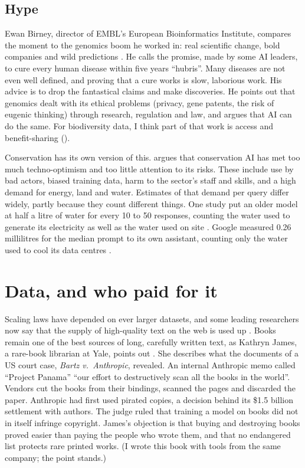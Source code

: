 \subsection{Hype}

Ewan Birney, director of EMBL's European Bioinformatics Institute, compares the
moment to the genomics boom he worked in: real scientific change, bold companies
and wild predictions \parencite{birney2026genomics}. He calls the promise,
made by some AI leaders, to cure every human disease within five years
``hubris''. Many
diseases are not even well defined, and proving that a cure works is slow,
laborious work. His advice is to drop the fantastical claims and make
discoveries. He points out that genomics dealt with its ethical problems
(privacy, gene patents, the risk of eugenic thinking) through research,
regulation and law, and argues that AI can do the same. For biodiversity data,
I think part of that work is access and benefit-sharing ().

Conservation has its own version of this. \textcite{sandbrook2024hype} argues
that conservation AI has met too much techno-optimism and too little attention
to its risks. These include use by bad actors, biased training data, harm to the
sector's staff and skills, and a high demand for energy, land and water. Estimates
of that demand per query differ widely, partly because they count different
things. One study put an older model at half a litre of water for every 10 to
50 responses, counting the water used to generate its electricity as well as
the water used on site \parencite{li2023thirsty}. Google measured 0.26
millilitres for the median prompt to its own assistant, counting only the water
used to cool its data centres \parencite{elsworth2025google}.

\section{Data, and who paid for it}

Scaling laws have depended on ever larger datasets, and some leading
researchers now say that the supply of high-quality text on the web is used up
\parencite{aiindex2026}. Books remain one of the best sources of long,
carefully written text, as Kathryn James, a rare-book librarian at Yale, points
out \parencite{james2026anthropicbooks}. She describes what the documents of a
US court case, \emph{Bartz v.\ Anthropic}, revealed. An internal Anthropic memo called
``Project Panama'' ``our effort to destructively scan all the books in the
world''. Vendors cut the books from their bindings, scanned the pages and
discarded the paper. Anthropic had first used pirated copies, a decision behind
its \$1.5 billion settlement with authors. The judge ruled that training a
model on books did not in itself infringe copyright. James's objection is that
buying and destroying books proved easier than paying the people who wrote
them, and that no endangered list protects rare printed works. (I wrote this
book with tools from the same company; the point stands.)


